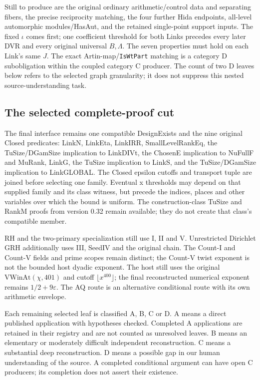 Still to produce are the original ordinary arithmetic/control data
and separating fibers, the precise reciprocity matching, the four
further Hida endpoints, all-level automorphic modules/HasAut, and
the retained single-point support inputs. The fixed $\iota$
comes first; one coefficient threshold for both Links precedes
every later DVR and every original universal $B,\Lambda$.
The seven properties must hold on each Link's same $J$.
The exact Artin-map/\texttt{IsWtPart} matching is a category D
subobligation within the coupled category C producer. The count
of two D leaves below refers to the selected graph granularity;
it does not suppress this nested source-understanding task.

\subsection{The selected complete-proof cut}

The final interface remains one compatible DesignExists and the
nine original Closed predicates: LinkN, LinkEta, LinkIRR,
SmallLevelRankEq, the TuSize/DGamSize implication to LinkDIVt,
the ChosenE implication to NuFullF and MuRank, LinkG, the TuSize
implication to LinkS, and the TuSize/DGamSize implication to
LinkGLOBAL. The Closed epsilon cutoffs and transport tuple are joined before
selecting one family. Eventual x thresholds may depend on that
supplied family and its class witness, but precede the indices,
places and other variables over which the bound is uniform. The construction-class TuSize and RankM proofs from
version 0.32 remain available; they do not create that class's
compatible member.

RH and the two-primary specialization still use I, II and V.
Unrestricted Dirichlet GRH additionally uses III, SeedIV and the
original chain. The Count-I and Count-V fields and prime scopes
remain distinct; the Count-V twist exponent is not the bounded
host dyadic exponent. The host still uses the original
$\mathrm{VWinAt}(\chi,401)$ and cutoff $\lfloor x^{400}\rfloor$;
the final reconstructed numerical exponent remains
$1/2+9\varepsilon$. The AQ route is an alternative conditional
route with its own arithmetic envelope.

Each remaining selected leaf is classified A, B, C or D. A means
a direct published application with hypotheses checked. Completed
A applications are retained in their registry and are not counted
as unresolved leaves. B means an elementary or moderately difficult
independent reconstruction. C means a substantial deep reconstruction.
D means a possible gap in our human understanding of the source.
A completed conditional argument can have open C producers;
its completion does not assert their existence.


